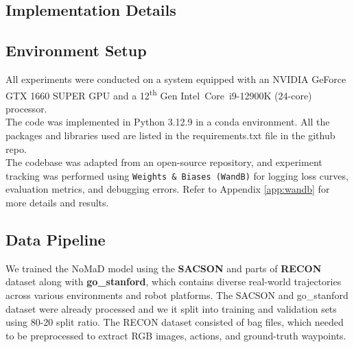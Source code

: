 \documentclass[12pt]{article}
\begin{document}
\begin{appendices}
\section{Implementation Details}
\label{app:implementation}
\subsection{Environment Setup}
All experiments were conducted on a system equipped with an NVIDIA GeForce GTX 1660 SUPER GPU and a 12\textsuperscript{th} Gen Intel\textregistered~Core\texttrademark~i9-12900K (24-core) processor. \\
The code was implemented in Python 3.12.9 in a conda environment. All the packages and libraries used are listed in the requirements.txt file in the github repo.\\
The codebase was adapted from an open-source repository\cite{gitnomad}, and experiment tracking was performed using \texttt{Weights \& Biases (WandB)} for logging loss curves, evaluation metrics, and debugging errors. Refer to Appendix \ref{app:wandb} for more details and results.\\
\subsection{Data Pipeline}
We trained the NoMaD model using the \textbf{SACSON} and parts of \textbf{RECON} dataset along with \textbf{go\_stanford}, which contains diverse real-world trajectories across various environments and robot platforms.
The SACSON and go\_stanford dataset were already processed and we it split into training and validation sets using 80-20 split ratio. The RECON dataset consisted of bag files, which needed to be preprocessed to extract RGB images, actions, and ground-truth waypoints.


\end{appendices}
\end{document}
